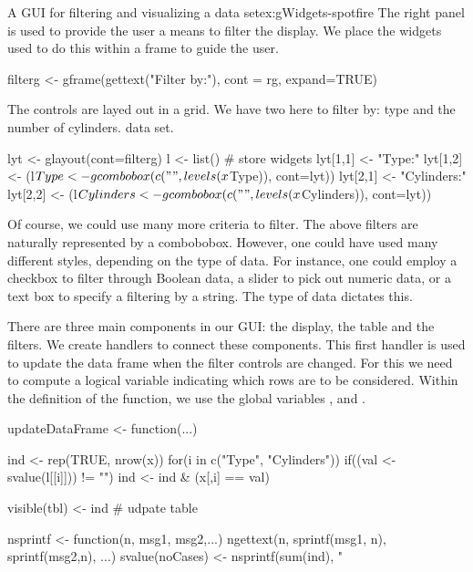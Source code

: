 \begin{example}{A GUI for filtering and visualizing a data set}{ex:gWidgets-spotfire}
The right panel is used to provide the user a means to filter the
display. We place the widgets used to do this within a frame to guide
the user.
\begin{Schunk}
\begin{Sinput}
 filterg <- gframe(gettext("Filter by:"), cont = rg, expand=TRUE)
\end{Sinput}
\end{Schunk}
The controls are layed out in a grid. We have two here to filter by:
type and the number of cylinders.
data set.
\begin{Schunk}
\begin{Sinput}
 lyt <- glayout(cont=filterg)
 l <- list() # store widgets
 lyt[1,1] <- "Type:"
 lyt[1,2] <- (l$Type <- gcombobox(c("", levels(x$Type)), 
                                  cont=lyt))
 lyt[2,1] <- "Cylinders:"
 lyt[2,2] <- (l$Cylinders <- 
              gcombobox(c("", levels(x$Cylinders)), cont=lyt))
\end{Sinput}
\end{Schunk}
%
Of course, we could use many more criteria to filter. The above
filters are naturally represented by a combobobox. However, one could
have used many different styles, depending on the type of data. For
instance, one could employ a checkbox to filter through Boolean data,
a slider to pick out numeric data, or a text box to specify a
filtering by a string. The type of data dictates this.

There are three main components in our GUI: the display, the table and
the filters. We create handlers to connect these components. This
first handler is used to
update the data frame when the filter controls are changed. For this
we need to compute a logical variable indicating which rows are to be
considered.  Within the definition of the function, we use the global
variables ,  and .
\begin{Schunk}
\begin{Sinput}
 updateDataFrame <- function(...) {
   ind <- rep(TRUE, nrow(x))
   for(i in c("Type", "Cylinders"))  {
     if((val <- svalue(l[[i]])) != "") 
       ind <- ind & (x[,i] == val)
   }
   
   visible(tbl) <- ind                   # udpate table
   
   nsprintf <- function(n, msg1, msg2,...)
     ngettext(n, sprintf(msg1, n), sprintf(msg2,n), ...)
   svalue(noCases) <- nsprintf(sum(ind), "%
 }
\end{Sinput}
\end{Schunk}


\end{example}

